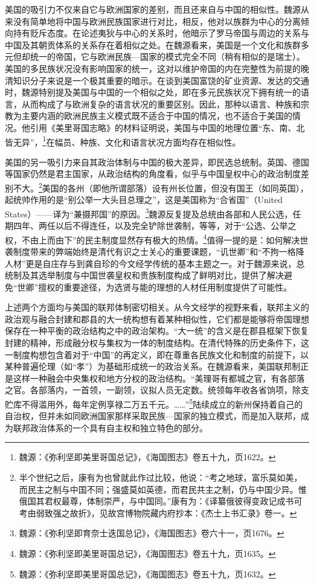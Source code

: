 \documentclass[a4paper, 12pt, openright]{ctexbook}
\begin{document}
美国的吸引力不仅来自它与欧洲国家的差别，而且还来自与中国的相似性。魏源从来没有简单地将中国与欧洲民族国家进行对比，相反，他对以族群为中心的分离倾向持有贬斥态度。在论述夷狄与中心的关系时，他暗示了罗马帝国与周边的关系与中国及其朝贡体系的关系存在着相似之处。在魏源看来，美国是一个文化和族群多元但却统一的帝国，它与欧洲民族—国家的模式完全不同（稍有相似的是瑞士）。美国的多民族状况没有影响国家的统一，这对以维护帝国的内在完整性为前提的晚清知识分子来说是一个极其重要的暗示。在谈到美国富饶的矿业资源、发达的交通时，魏源特别提及美国与中国的一个相似之处，即在多元民族状况下拥有统一的语言，从而构成了与欧洲复杂的语言状况的重要区别。因此，那种以语言、种族和宗教为主要内涵的欧洲民族主义模式既不适合于中国的情况，也不适合于美国的情况。他引用《美里哥国志略》的材料证明说，美国与中国的地理位置“东、南、北皆无异”，\footnote{魏源：《弥利坚即美里哥国总记》，《海国图志》卷五十九，页1622。}在幅员、种族、文化和语言状况方面均存在相似性。

美国的另一吸引力来自其政治体制与中国的极大差异，即民选总统制。英国、德国等国家仍然是君主国家，从政治结构的角度看，似乎与中国皇权中心的政治制度差别不大。\footnote{半个世纪之后，康有为也曾就此作过比较，他说：“考之地球，富乐莫如美，而民主之制与中国不同；强盛莫如英德，而君民共主之制，仍与中国少异。惟俄国其君权最尊，体制崇严，与中国同。”康有为：《译纂俄彼得变政记成书可考由弱致强之故折》，见故宫博物院藏内府抄本：《杰士上书汇录》卷一。}美国的各州（即他所谓部落）设有州长位置，但没有国王（如同英国），起统帅作用的是“别公举一大头目总理之”，这是美国称为“合省国”（United States）——译为“兼摄邦国”的原因。\footnote{魏源：《弥利坚即育奈士迭国总记》，《海国图志》卷六十一，页1676。}魏源反复提及总统由各部和人民公选，任期四年、两任以后不得连任，以及完全铲除世袭制，等等，对于“公选、公举之权，不由上而由下”的民主制度显然存有极大的热情。\footnote{魏源：《弥利坚即美里哥国总记》，《海国图志》卷五十九，页1635。}值得一提的是：如何解决世袭制度带来的弊端始终是清代有识之士关心的重要课题，“讥世卿”和“不拘一格降人材”更是自庄存与到龚自珍的今文经学传统的基本主题之一。对于魏源来说，总统制及其选举制度与中国世袭皇权和贵族制度构成了鲜明对比，提供了解决避免“世卿”擅权的重要途径，为选贤与能的理想的人材任用制度提供了可能性。

上述两个方面均与美国的联邦体制密切相关。从今文经学的视野来看，联邦主义的政治观与融合封建和郡县的大一统构想有着某种相似性，它们都是能够将帝国理想保存在一种平衡的政治结构之中的政治架构。“大一统”的含义是在郡县框架下恢复封建的精神，形成融分权与集权为一体的制度结构。在清代特殊的历史条件下，这一制度构想包含着对于“中国”的再定义，即在尊重各民族文化和制度的前提下，以某种普遍伦理（如“孝”）为基础形成统一的政治关系。在魏源看来，美国联邦制正是这样一种融会中央集权和地方分权的政治结构。“美理哥有都城之官，有各部落之官。各部落内，一首领，一副领，议拟人员无定数。统领每年收各省饷项，除支贮库不得滥用外，每年定例享禄二万五千元。……”\footnote{魏源：《弥利坚即美里哥国总记》，《海国图志》卷五十九，页1632。}陆续成立的新州保持着自己的自治权，但并未如同欧洲国家那样采取民族—国家的独立模式，而是加入联邦，成为联邦政治体系的一个具有自主权和独立特色的部分。
\end{document}
